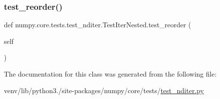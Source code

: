 \subsubsection{\texorpdfstring{test\+\_\+reorder()}{test\_reorder()}}
{\footnotesize\ttfamily def numpy.\+core.\+tests.\+test\+\_\+nditer.\+Test\+Iter\+Nested.\+test\+\_\+reorder (\begin{DoxyParamCaption}\item[{}]{self }\end{DoxyParamCaption})}



The documentation for this class was generated from the following file\+:\begin{DoxyCompactItemize}
\item 
venv/lib/python3./site-\/packages/numpy/core/tests/\hyperlink{test__nditer_8py}{test\+\_\+nditer.\+py}\end{DoxyCompactItemize}
